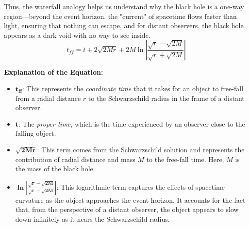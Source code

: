 \documentclass[12pt,a4paper]{article}
\begin{document}
Thus, the waterfall analogy helps us understand why the black hole is a one-way region—beyond the event horizon, the "current" of spacetime flows faster than light, ensuring that nothing can escape, and for distant observers, the black hole appears as a dark void with no way to see inside.
\[
t_{ff} = t + 2\sqrt{2Mr} + 2M \ln \left| \frac{\sqrt{r} - \sqrt{2M}}{\sqrt{r} + \sqrt{2M}} \right|
\]

\textbf{Explanation of the Equation:}

\begin{itemize}
    \item \(\mathbf{t_{ff}}\): This represents the \textit{coordinate time} that it takes for an object to free-fall from a radial distance \(r\) to the Schwarzschild radius in the frame of a distant observer. 
    \item \(\mathbf{t}\): The \textit{proper time}, which is the time experienced by an observer close to the falling object.
    \item \(\mathbf{\sqrt{2Mr}}\): This term comes from the Schwarzschild solution and represents the contribution of radial distance and mass \(M\) to the free-fall time. Here, \(M\) is the mass of the black hole.
    \item \(\mathbf{\ln \left| \frac{\sqrt{r} - \sqrt{2M}}{\sqrt{r} + \sqrt{2M}} \right|}\): This logarithmic term captures the effects of spacetime curvature as the object approaches the event horizon. It accounts for the fact that, from the perspective of a distant observer, the object appears to slow down infinitely as it nears the Schwarzschild radius.
    
\end{itemize}
\end{document}
